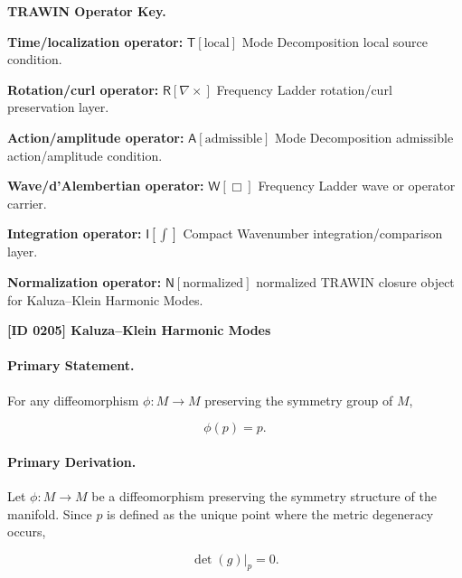\par\vspace{0.45\baselineskip}
\noindent\begin{minipage}[t]{\linewidth}
\begingroup
\small
\raggedright
\textbf{TRAWIN Operator Key.}\par
\noindent\textbf{Time/localization operator:} $\mathsf{T}\!\left[\mathrm{local}\right]$ Mode Decomposition local source condition.\par
\noindent\textbf{Rotation/curl operator:} $\mathsf{R}\!\left[\nabla\times\right]$ Frequency Ladder rotation/curl preservation layer.\par
\noindent\textbf{Action/amplitude operator:} $\mathsf{A}\!\left[\mathrm{admissible}\right]$ Mode Decomposition admissible action/amplitude condition.\par
\noindent\textbf{Wave/d'Alembertian operator:} $\mathsf{W}\!\left[\Box\right]$ Frequency Ladder wave or operator carrier.\par
\noindent\textbf{Integration operator:} $\mathsf{I}\!\left[\int\right]$ Compact Wavenumber integration/comparison layer.\par
\noindent\textbf{Normalization operator:} $\mathsf{N}\!\left[\mathrm{normalized}\right]$ normalized TRAWIN closure object for Kaluza--Klein Harmonic Modes.\par
\endgroup
\end{minipage}

\clearpage
\noindent\textbf{[ID 0205] Kaluza--Klein Harmonic Modes}\par
\vspace{0.35em}
\paragraph{Primary Statement.}
For any diffeomorphism $\phi:M\to M$ preserving the symmetry group of $M$,

\begin{equation}
\phi(p)=p .
\end{equation}

\paragraph{Primary Derivation.}
Let $\phi:M\to M$ be a diffeomorphism preserving the symmetry structure of the manifold. Since $p$ is defined as the unique point where the metric degeneracy occurs,

\begin{equation}
\det(g)\big|_p=0 .
\end{equation}

